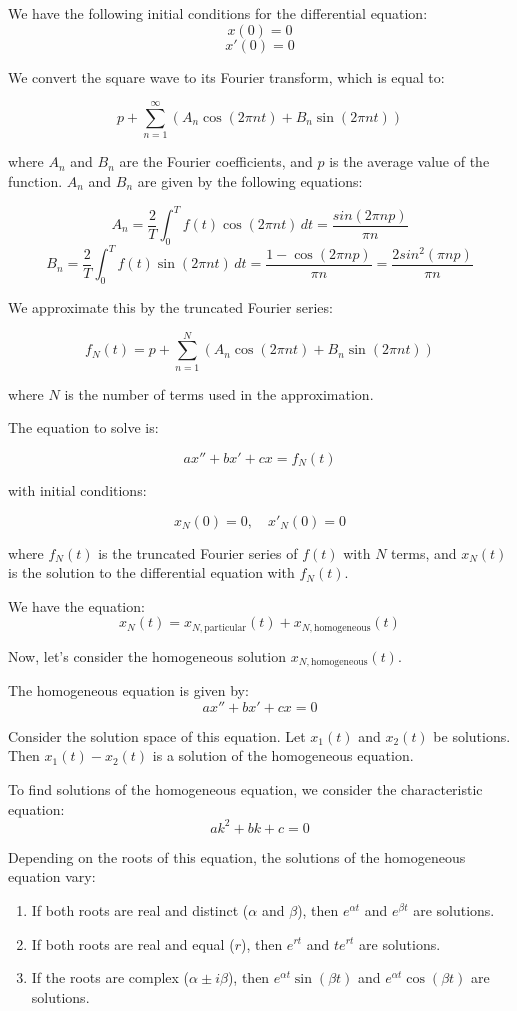 \documentclass{article}
\begin{document}
We have the following initial conditions for the differential equation:
\[ x(0) = 0 \]
\[ x'(0) = 0 \]

We convert the square wave to its Fourier transform, which is equal to:

\[
p + \sum_{n=1}^{\infty} \left( A_n \cos(2\pi n t) + B_n \sin(2\pi n t) \right)
\]

where \( A_n \) and \( B_n \) are the Fourier coefficients, and \( p \) is the average value of the function.
\(A_n\) and \(B_n\) are given by the following equations:

\[A_n = \frac{2}{T} \int_{0}^{T} f(t) \cos(2\pi n t) \, dt = \frac{sin(2 \pi n p)}{\pi n}\]
\[B_n = \frac{2}{T} \int_{0}^{T} f(t) \sin(2\pi n t) \, dt = \frac{1 - \cos(2 \pi n p)}{\pi n}= \frac{2 sin^2(\pi n p)}{\pi n}\]

We approximate this by the truncated Fourier series:

\[
f_N(t) = p + \sum_{n=1}^{N} \left( A_n \cos(2\pi n t) + B_n \sin(2\pi n t) \right)
\]

where \( N \) is the number of terms used in the approximation.

The equation to solve is:

\[
ax'' + bx' + cx = f_N(t)
\]

with initial conditions:

\[
x_N(0) = 0, \quad x'_N(0) = 0
\]

where \( f_N(t) \) is the truncated Fourier series of \( f(t) \) with \( N \) terms,
and \( x_N(t) \) is the solution to the differential equation with \( f_N(t) \).

We have the equation:
\begin{equation}
x_N(t) = x_{N,\text{particular}}(t) + x_{N,\text{homogeneous}}(t)
\end{equation}

Now, let's consider the homogeneous solution \(x_{N,\text{homogeneous}}(t)\). 

The homogeneous equation is given by:
\[
ax'' + bx' + cx = 0
\]

Consider the solution space of this equation. Let \(x_1(t)\) and \(x_2(t)\) be solutions. Then \(x_1(t) - x_2(t)\) is a solution of the homogeneous equation.

To find solutions of the homogeneous equation, we consider the characteristic equation:
\[
a k^2 + b k + c = 0
\]

Depending on the roots of this equation, the solutions of the homogeneous equation vary:
\begin{enumerate}
    \item If both roots are real and distinct (\( \alpha \) and \( \beta \)), then \( e^{\alpha t} \) and \( e^{\beta t} \) are solutions.
    \item If both roots are real and equal (\( r \)), then \( e^{rt} \) and \( t e^{rt} \) are solutions.
    \item If the roots are complex (\( \alpha \pm i \beta \)), then \( e^{\alpha t} \sin(\beta t) \) and \( e^{\alpha t} \cos(\beta t) \) are solutions.
\end{enumerate}
\end{document}
